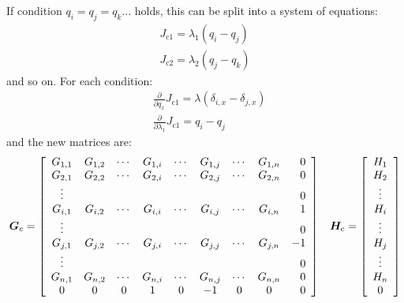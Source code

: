 \documentclass[a4paper]{report}
\newcommand{\bs}{\boldsymbol}
\newcommand{\mr}{\mathrm}
\begin{document}
If condition $q_i = q_j = q_k \dots$ holds, this can be split into a system of
equations:
\begin{align}
J_{\mr{c}1} = \lambda_1 \left( q_i - q_j \right) \nonumber \\
J_{\mr{c}2} = \lambda_2 \left( q_j - q_k \right) \nonumber 
\end{align}
and so on. For each condition:
\begin{align}
&\frac{\partial}{\partial q_x} J_{\mr{c}1} = \lambda (\delta_{i,x} - \delta_{j,x}) \\
&\frac{\partial}{\partial \lambda_1} J_{\mr{c}1} = q_i - q_j
\end{align}
and the new matrices are:
\begin{equation}
\bs{G}_c = \left[ \begin{array}{ccccccccr} 
G_{1,1} & G_{1,2} & \cdots & G_{1,i} & \cdots & G_{1,j} & \cdots & G_{1,n} & 0 \\
G_{2,1} & G_{2,2} & \cdots & G_{2,i} & \cdots & G_{2,j} & \cdots & G_{2,n} & 0 \\
\vdots  &         &        &         &        &         &        &         & 0 \\
G_{i,1} & G_{i,2} & \cdots & G_{i,i} & \cdots & G_{i,j} & \cdots & G_{i,n} & 1 \\
\vdots  &         &        &         &        &         &        &         & 0 \\
G_{j,1} & G_{j,2} & \cdots & G_{j,i} & \cdots & G_{j,j} & \cdots & G_{j,n} & -1 \\
\vdots  &         &        &         &        &         &        &         & 0 \\
G_{n,1} & G_{n,2} & \cdots & G_{n,i} & \cdots & G_{n,j} & \cdots & G_{n,n} & 0 \\
0       & 0       & 0      & 1       & 0      & -1      & 0      & 0       & 0 \\
\end{array} \right] \hspace{0.3cm} \bs{H}_\mr{c} = \left[ \begin{array}{c} H_1 \\ H_2
\\ \vdots \\ H_i \\ \vdots \\ H_j \\ \vdots \\ H_n \\ 0 \end{array}
\right]
\end{equation}
\end{document}
